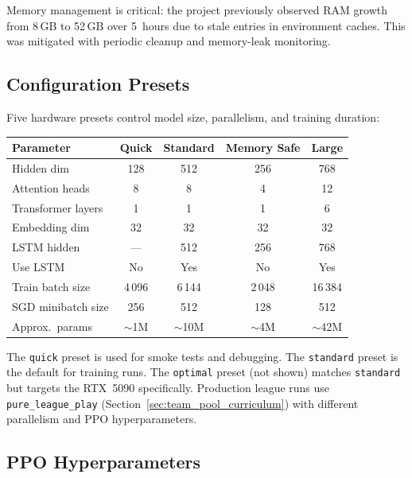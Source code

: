 Memory management is critical: the project previously observed RAM growth from
8\,GB to 52\,GB over 5~hours due to stale entries in environment caches.  This
was mitigated with periodic cleanup and memory-leak monitoring.

\subsection{Configuration Presets}

Five hardware presets control model size, parallelism, and training duration:

\begin{center}
\small
\begin{tabularx}{\textwidth}{l c c c c}
  \toprule
  \textbf{Parameter} & \textbf{Quick} & \textbf{Standard} & \textbf{Memory Safe} & \textbf{Large} \\
  \midrule
  Hidden dim              & 128   & 512   & 256   & 768   \\
  Attention heads         & 8     & 8     & 4     & 12    \\
  Transformer layers      & 1     & 1     & 1     & 6     \\
  Embedding dim           & 32    & 32    & 32    & 32    \\
  LSTM hidden             & ---   & 512   & 256   & 768   \\
  Use LSTM                & No    & Yes   & No    & Yes   \\
  Train batch size        & 4\,096  & 6\,144  & 2\,048  & 16\,384 \\
  SGD minibatch size      & 256   & 512   & 128   & 512   \\
  Approx.\ params         & $\sim$1M & $\sim$10M & $\sim$4M & $\sim$42M \\
  \bottomrule
\end{tabularx}
\end{center}

The \texttt{quick} preset is used for smoke tests and debugging.  The
\texttt{standard} preset is the default for training runs.  The
\texttt{optimal} preset (not shown) matches \texttt{standard} but targets the
RTX~5090 specifically.
Production league runs use \texttt{pure\_league\_play}
(Section~\ref{sec:team_pool_curriculum}) with different parallelism and PPO
hyperparameters.
\subsection{PPO Hyperparameters}

